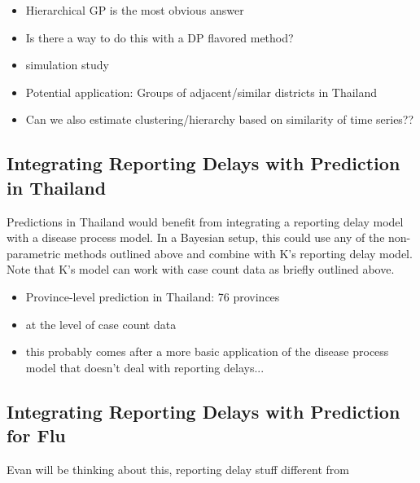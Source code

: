 \documentclass{article}
\begin{document}
\begin{itemize}
\item Hierarchical GP is the most obvious answer
\item Is there a way to do this with a DP flavored method?
\item simulation study
\item Potential application: Groups of adjacent/similar districts in Thailand
\item Can we also estimate clustering/hierarchy based on similarity of time series??
\end{itemize}


\subsection{Integrating Reporting Delays with Prediction in Thailand}

Predictions in Thailand would benefit from integrating a reporting delay model with a disease process model.  In a Bayesian setup, this could use any of the non-parametric methods outlined above and combine with K's reporting delay model.  Note that K's model can work with case count data as briefly outlined above.

\begin{itemize}
\item Province-level prediction in Thailand: 76 provinces
\item at the level of case count data
\item this probably comes after a more basic application of the disease process model that doesn't deal with reporting delays...
\end{itemize}


\subsection{Integrating Reporting Delays with Prediction for Flu}

Evan will be thinking about this, reporting delay stuff different from 
\end{document}
